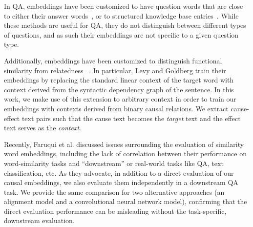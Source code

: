 In QA, embeddings have been customized to have question words that are close to either their answer words~\cite{bordes2014question}, or to structured knowledge base entries~\cite{yang2014joint}.  While these methods are useful for QA, they do not distinguish between different types of questions, and as such their embeddings are not specific to a given question type.

Additionally, embeddings have been customized to distinguish functional similarity from relatedness ~\cite{levy2014dependency,kielaspecializing}.
In particular, Levy and Goldberg train their embeddings by replacing the standard linear context of the target word with context derived from the syntactic dependency graph of the sentence.  
In this work, we make use of this extension to arbitrary context in order to train our embeddings with contexts derived from binary causal relations.  We extract cause-effect text pairs such that the cause text becomes the \emph{target} text and the effect text serves as the \emph{context}. 

Recently, Faruqui et al. discussed issues surrounding the evaluation of similarity word embeddings, including the lack of correlation between their performance on word-similarity tasks and ``downstream'' or real-world tasks like QA, text classification, etc.  As they advocate, in addition to a direct evaluation of our causal embeddings, we also evaluate them independently in a downstream QA task.  We provide the same comparison for two alternative approaches (an alignment model and a convolutional neural network model), confirming that the direct evaluation performance can be misleading without the task-specific, downstream evaluation. 



